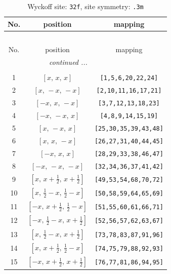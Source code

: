\documentclass[fleqn,8pt]{jsarticle}
\begin{document}
\begin{longtable}{ccc}
\caption{Wyckoff site: {\tt 32f}, site symmetry: {\tt .3m}}
 \\
 \hline \hline
No. & position & mapping \\ \hline \endfirsthead

\multicolumn{2}{l}{\tablename\ \thetable{}} \\
 \hline \hline
No. & position & mapping \\ \hline \endhead

 \hline \hline
\multicolumn{2}{r}{\footnotesize\it continued ...} \\ \endfoot

 \hline \hline
\multicolumn{2}{r}{} \\ \endlastfoot

1 & $\left[ x,\, x,\, x \right]$ & {\tt [1,5,6,20,22,24]} \\ \hline
2 & $\left[ x,\, - x,\, - x \right]$ & {\tt [2,10,11,16,17,21]} \\ \hline
3 & $\left[ - x,\, x,\, - x \right]$ & {\tt [3,7,12,13,18,23]} \\ \hline
4 & $\left[ - x,\, - x,\, x \right]$ & {\tt [4,8,9,14,15,19]} \\ \hline
5 & $\left[ x,\, - x,\, x \right]$ & {\tt [25,30,35,39,43,48]} \\ \hline
6 & $\left[ x,\, x,\, - x \right]$ & {\tt [26,27,31,40,44,45]} \\ \hline
7 & $\left[ - x,\, x,\, x \right]$ & {\tt [28,29,33,38,46,47]} \\ \hline
8 & $\left[ - x,\, - x,\, - x \right]$ & {\tt [32,34,36,37,41,42]} \\ \hline
9 & $\left[ x,\, x + \frac{1}{2},\, x + \frac{1}{2} \right]$ & {\tt [49,53,54,68,70,72]} \\ \hline
10 & $\left[ x,\, \frac{1}{2} - x,\, \frac{1}{2} - x \right]$ & {\tt [50,58,59,64,65,69]} \\ \hline
11 & $\left[ - x,\, x + \frac{1}{2},\, \frac{1}{2} - x \right]$ & {\tt [51,55,60,61,66,71]} \\ \hline
12 & $\left[ - x,\, \frac{1}{2} - x,\, x + \frac{1}{2} \right]$ & {\tt [52,56,57,62,63,67]} \\ \hline
13 & $\left[ x,\, \frac{1}{2} - x,\, x + \frac{1}{2} \right]$ & {\tt [73,78,83,87,91,96]} \\ \hline
14 & $\left[ x,\, x + \frac{1}{2},\, \frac{1}{2} - x \right]$ & {\tt [74,75,79,88,92,93]} \\ \hline
15 & $\left[ - x,\, x + \frac{1}{2},\, x + \frac{1}{2} \right]$ & {\tt [76,77,81,86,94,95]} \\ \hline

\end{longtable}
\end{document}
